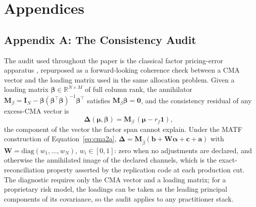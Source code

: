 \documentclass[pdftex,12pt,a4paper]{article}
\begin{document}
\section*{Appendices}\label{sec:appendices}

\subsection*{Appendix A: The Consistency Audit}\label{app:consistency_diagnostic}

The audit used throughout the paper is the classical factor pricing-error apparatus \citep{Ross1976,Cochrane2005,CampbellLoMacKinlay1997}, repurposed as a forward-looking coherence check between a CMA vector and the loading matrix used in the same allocation problem. Given a loading matrix $\boldsymbol\beta \in \mathbb{R}^{N\times M}$ of full column rank, the annihilator $\boldsymbol M_\beta = \boldsymbol I_N - \boldsymbol\beta(\boldsymbol\beta^\intercal\boldsymbol\beta)^{-1}\boldsymbol\beta^\intercal$ satisfies $\boldsymbol M_\beta\boldsymbol\beta = \boldsymbol 0$, and the consistency residual of any excess-CMA vector is
\begin{equation}\label{eq:consistency_residual}
	\boldsymbol\Delta(\boldsymbol\mu, \boldsymbol\beta) = \boldsymbol M_\beta\,(\boldsymbol\mu - r_f\boldsymbol 1),
\end{equation}
the component of the vector the factor span cannot explain. Under the MATF construction of Equation~\eqref{eq:cma2a}, $\boldsymbol\Delta = \boldsymbol M_{\hat\beta}(\boldsymbol b + \boldsymbol W\boldsymbol\alpha + \boldsymbol c + \boldsymbol a)$ with $\boldsymbol W = \text{diag}(w_1,\dots,w_N)$, $w_i \in [0,1]$: zero when no adjustments are declared, and otherwise the annihilated image of the declared channels, which is the exact-reconciliation property asserted by the replication code at each production cut. The diagnostic requires only the CMA vector and a loading matrix; for a proprietary risk model, the loadings can be taken as the leading principal components of its covariance, so the audit applies to any practitioner stack.
\end{document}
